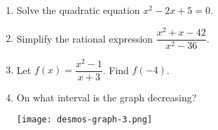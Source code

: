 \documentclass{article}
\begin{document}
\begin{enumerate}
  \item Solve the quadratic equation \(x^{2}-2x+5=0\). 

  \begin{enumerate}
  \end{enumerate}

  \item Simplify the rational expression \(\dfrac{x^2+x-42}{x^2-36}\).

  \begin{enumerate}
  \end{enumerate}

  \item Let \(f(x)=\dfrac{x^2-1}{x+3}\). Find \(f(-4)\).

  \begin{enumerate}
  \end{enumerate}

  \item On what interval is the graph decreasing?
 
     \texttt{[image: desmos-graph-3.png]}

  \begin{enumerate}
  \end{enumerate}


\end{enumerate}
\end{document}
